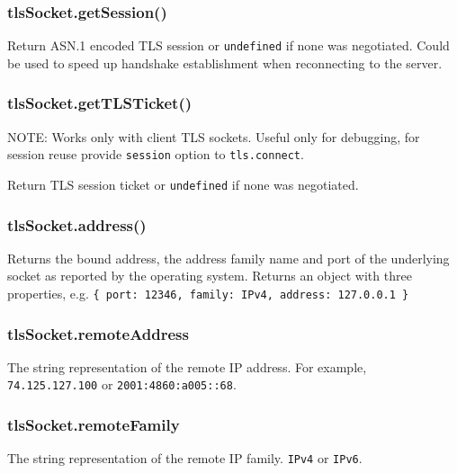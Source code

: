 \subsubsection{tlsSocket.getSession()}\label{tlssocket.getsession}

Return ASN.1 encoded TLS session or \texttt{undefined} if none was
negotiated. Could be used to speed up handshake establishment when
reconnecting to the server.

\subsubsection{tlsSocket.getTLSTicket()}\label{tlssocket.gettlsticket}

NOTE: Works only with client TLS sockets. Useful only for debugging, for
session reuse provide \texttt{session} option to \texttt{tls.connect}.

Return TLS session ticket or \texttt{undefined} if none was negotiated.

\subsubsection{tlsSocket.address()}\label{tlssocket.address}

Returns the bound address, the address family name and port of the
underlying socket as reported by the operating system. Returns an object
with three properties, e.g.
\texttt{\{\ port:\ 12346,\ family:\ \textquotesingle{}IPv4\textquotesingle{},\ address:\ \textquotesingle{}127.0.0.1\textquotesingle{}\ \}}

\subsubsection{tlsSocket.remoteAddress}\label{tlssocket.remoteaddress}

The string representation of the remote IP address. For example,
\texttt{\textquotesingle{}74.125.127.100\textquotesingle{}} or
\texttt{\textquotesingle{}2001:4860:a005::68\textquotesingle{}}.

\subsubsection{tlsSocket.remoteFamily}\label{tlssocket.remotefamily}

The string representation of the remote IP family.
\texttt{\textquotesingle{}IPv4\textquotesingle{}} or
\texttt{\textquotesingle{}IPv6\textquotesingle{}}.


